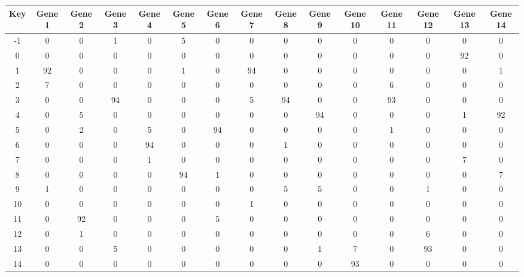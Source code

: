 \begin{tabular}{|c|c|c|c|c|c|c|c|c|c|c|c|c|c|c|}
\hline
Key & Gene 1 & Gene 2 & Gene 3 & Gene 4 & Gene 5 & Gene 6 & Gene 7 & Gene 8 & Gene 9 & Gene 10 & Gene 11 & Gene 12 & Gene 13 & Gene 14 \\
\hline
-1 & 0 & 0 & 1 & 0 & 5 & 0 & 0 & 0 & 0 & 0 & 0 & 0 & 0 & 0 \\
0 & 0 & 0 & 0 & 0 & 0 & 0 & 0 & 0 & 0 & 0 & 0 & 0 & 92 & 0 \\
1 & 92 & 0 & 0 & 0 & 1 & 0 & 94 & 0 & 0 & 0 & 0 & 0 & 0 & 1 \\
2 & 7 & 0 & 0 & 0 & 0 & 0 & 0 & 0 & 0 & 0 & 6 & 0 & 0 & 0 \\
3 & 0 & 0 & 94 & 0 & 0 & 0 & 5 & 94 & 0 & 0 & 93 & 0 & 0 & 0 \\
4 & 0 & 5 & 0 & 0 & 0 & 0 & 0 & 0 & 94 & 0 & 0 & 0 & 1 & 92 \\
5 & 0 & 2 & 0 & 5 & 0 & 94 & 0 & 0 & 0 & 0 & 1 & 0 & 0 & 0 \\
6 & 0 & 0 & 0 & 94 & 0 & 0 & 0 & 1 & 0 & 0 & 0 & 0 & 0 & 0 \\
7 & 0 & 0 & 0 & 1 & 0 & 0 & 0 & 0 & 0 & 0 & 0 & 0 & 7 & 0 \\
8 & 0 & 0 & 0 & 0 & 94 & 1 & 0 & 0 & 0 & 0 & 0 & 0 & 0 & 7 \\
9 & 1 & 0 & 0 & 0 & 0 & 0 & 0 & 5 & 5 & 0 & 0 & 1 & 0 & 0 \\
10 & 0 & 0 & 0 & 0 & 0 & 0 & 1 & 0 & 0 & 0 & 0 & 0 & 0 & 0 \\
11 & 0 & 92 & 0 & 0 & 0 & 5 & 0 & 0 & 0 & 0 & 0 & 0 & 0 & 0 \\
12 & 0 & 1 & 0 & 0 & 0 & 0 & 0 & 0 & 0 & 0 & 0 & 6 & 0 & 0 \\
13 & 0 & 0 & 5 & 0 & 0 & 0 & 0 & 0 & 1 & 7 & 0 & 93 & 0 & 0 \\
14 & 0 & 0 & 0 & 0 & 0 & 0 & 0 & 0 & 0 & 93 & 0 & 0 & 0 & 0 \\
\hline
\end{tabular}